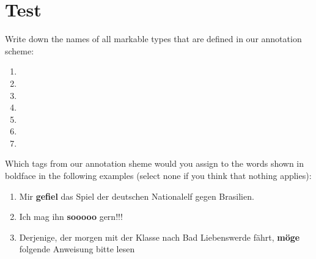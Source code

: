 \documentclass[12pt,fleqn]{scrreprt}
\begin{document}
\section*{Test}
\begin{enumerate}[I)]
  {\bfseries \item Write down the names of all markable types that are
    defined in our annotation scheme:}
  \begin{multicols}{2}
    \begin{enumerate}
    \item
    \item
    \item
    \item
    \item
    \item
    \item
    \end{enumerate}
  \end{multicols}

  {\bfseries\item Which tags from our annotation sheme would you assign
    to the words shown in boldface in the following examples (select
    none if you think that nothing applies):}
  \begin{enumerate}
  \item Mir \textbf{gefiel} das Spiel der deutschen Nationalelf gegen
    Brasilien.

  \item Ich mag ihn \textbf{sooooo} gern!!!

  \item Derjenige, der morgen mit der Klasse nach Bad Liebenswerde f\"ahrt,
    \textbf{m\"oge} folgende Anweisung bitte lesen


\end{enumerate}
\end{enumerate}
\end{document}
